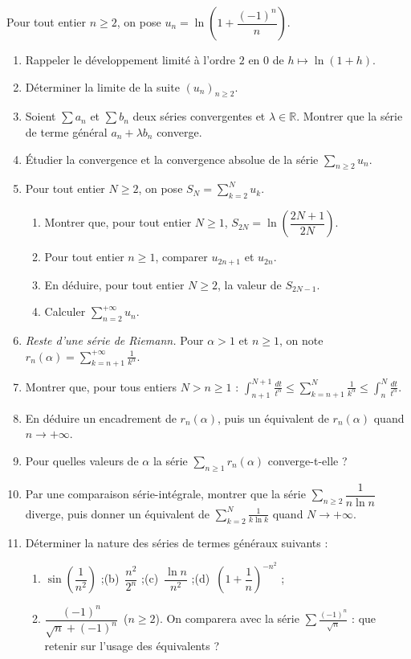 \documentclass[a4paper,11pt]{article}
\numberwithin{equation}{section}
\numberwithin{figure}{section}
\numberwithin{table}{section}
\theoremstyle{enonce}
\theoremstyle{exemple}
\theoremstyle{remarque}
\newcommand{\R}{\mathbb{R}}
\begin{document}
Pour tout entier $n\geq2$, on pose $u_n=\ln\left(1+\dfrac{(-1)^n}n\right)$.
\begin{enumerate}
\item Rappeler le développement limité à l'ordre $2$ en $0$ de $h\mapsto\ln(1+h)$.
\item Déterminer la limite de la suite $(u_n)_{n\geq2}$.
\item Soient $\sum a_n$ et $\sum b_n$ deux séries convergentes et $\lambda\in\R$. Montrer que la série de terme général $a_n+\lambda b_n$ converge.
\item Étudier la convergence et la convergence absolue de la série $\sum_{n\geq2}u_n$.
\item Pour tout entier $N\geq2$, on pose $S_N=\sum_{k=2}^Nu_k$.
\begin{enumerate}[label=(\alph*)]
\item Montrer que, pour tout entier $N\geq1$, $S_{2N}=\ln\left(\dfrac{2N+1}{2N}\right)$.
\item Pour tout entier $n\geq1$, comparer $u_{2n+1}$ et $u_{2n}$.
\item En déduire, pour tout entier $N\geq2$, la valeur de $S_{2N-1}$.
\item Calculer $\displaystyle\sum_{n=2}^{+\infty}u_n$.
\end{enumerate}
\item[] \emph{Reste d'une série de Riemann.} Pour $\alpha>1$ et $n\geq1$, on note $r_n(\alpha)=\displaystyle\sum_{k=n+1}^{+\infty}\frac1{k^\alpha}$.
\item Montrer que, pour tous entiers $N>n\geq1$ : $\displaystyle\int_{n+1}^{N+1}\frac{dt}{t^\alpha}\leq\sum_{k=n+1}^N\frac1{k^\alpha}\leq\int_n^N\frac{dt}{t^\alpha}$.
\item En déduire un encadrement de $r_n(\alpha)$, puis un équivalent de $r_n(\alpha)$ quand $n\to+\infty$.
\item Pour quelles valeurs de $\alpha$ la série $\sum_{n\geq1}r_n(\alpha)$ converge-t-elle ?
\item Par une comparaison série-intégrale, montrer que la série $\sum_{n\geq2}\dfrac1{n\ln n}$ diverge, puis donner un équivalent de
$\displaystyle\sum_{k=2}^N\frac1{k\ln k}$ quand $N\to+\infty$.
\item Déterminer la nature des séries de termes généraux suivants :
\begin{enumerate}[label=(\alph*)]
\item $\sin\left(\dfrac1{n^2}\right)$ ;\qquad (b)\ $\dfrac{n^2}{2^n}$ ;\qquad (c)\ $\dfrac{\ln n}{n^2}$ ;\qquad (d)\ $\left(1+\dfrac1n\right)^{-n^2}$ ;
\setcounter{enumii}{4}
\item $\dfrac{(-1)^n}{\sqrt n+(-1)^n}$\ ($n\geq2$). On comparera avec la série $\sum\frac{(-1)^n}{\sqrt n}$ : que retenir sur l'usage des équivalents ?
\end{enumerate}
\end{enumerate}
\end{document}
